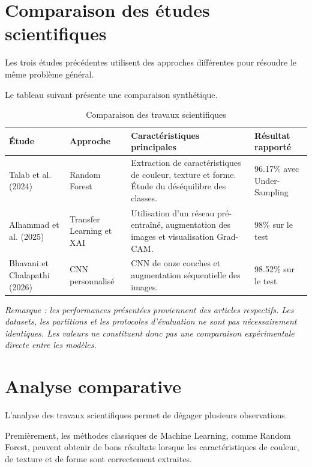\documentclass[12pt,a4paper,oneside]{report}
\begin{document}
\section{Comparaison des études scientifiques}

Les trois études précédentes utilisent des approches
différentes pour résoudre le même problème général.

Le tableau suivant présente une comparaison synthétique.

\begin{table}[H]
\centering
\caption{Comparaison des travaux scientifiques}
\small
\begin{tabularx}{\textwidth}{p{2.5cm}p{2.3cm}X p{2cm}}
\toprule
\textbf{Étude} &
\textbf{Approche} &
\textbf{Caractéristiques principales} &
\textbf{Résultat rapporté}\\
\midrule

Talab et al. (2024) &
Random Forest &
Extraction de caractéristiques de couleur, texture
et forme. Étude du déséquilibre des classes. &
96.17\% avec Under-Sampling\\

Alhammad et al. (2025) &
Transfer Learning et XAI &
Utilisation d'un réseau pré-entraîné, augmentation
des images et visualisation Grad-CAM. &
98\% sur le test\\

Bhavani et Chalapathi (2026) &
CNN personnalisé &
CNN de onze couches et augmentation séquentielle
des images. &
98.52\% sur le test\\

\bottomrule
\end{tabularx}
\end{table}

\textit{Remarque : les performances présentées proviennent
des articles respectifs. Les datasets, les partitions
et les protocoles d'évaluation ne sont pas nécessairement
identiques. Les valeurs ne constituent donc pas une
comparaison expérimentale directe entre les modèles.}

\section{Analyse comparative}

L'analyse des travaux scientifiques permet de dégager
plusieurs observations.

Premièrement, les méthodes classiques de Machine Learning,
comme Random Forest, peuvent obtenir de bons résultats
lorsque les caractéristiques de couleur, de texture
et de forme sont correctement extraites.
\end{document}
